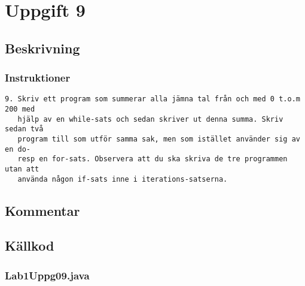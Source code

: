\section{Uppgift 9}\label{uppgift-9}

\subsection{Beskrivning}

\subsubsection*{Instruktioner}
\begin{verbatim}
9. Skriv ett program som summerar alla jämna tal från och med 0 t.o.m 200 med
   hjälp av en while-sats och sedan skriver ut denna summa. Skriv sedan två
   program till som utför samma sak, men som istället använder sig av en do-
   resp en for-sats. Observera att du ska skriva de tre programmen utan att
   använda någon if-sats inne i iterations-satserna.
\end{verbatim}

\subsection{Kommentar}

\subsection{Källkod}\label{uppgift-9_src}
\subsubsection*{Lab1Uppg09.java}
\inputminted[]{java}{src/Lab1Uppg09.java}
